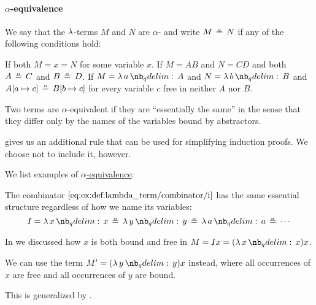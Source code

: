 \paragraph{\( \alpha \)-equivalence}

\begin{definition}\label{def:lambda_term_alpha_equivalence}\mimprovised
  We say that the \( \mathrm{\lambda} \)-terms \( M \) and \( N \) are \( \alpha \)- and write \( M \aequiv N \) if any of the following conditions hold:
  \begin{thmenum}
     If both \( M = x = N \) for some variable \( x \).
     If \( M = A B \) and \( N = C D \) and both \( A \aequiv C \) and \( B \aequiv D \).
     If \( M = \qabs a A \) and \( N = \qabs b B \) and \( A[a \mapsto c] \aequiv B[b \mapsto c] \) for every variable \( c \) free in neither \( A \) nor \( B \).
  \end{thmenum}
\end{definition}
\begin{comments}
  \item Two terms are \( \alpha \)-equivalent if they are \enquote{essentially the same} in the sense that they differ only by the names of the variables bound by abstractors.

  \item {} gives us an additional rule that can be used for simplifying induction proofs. We choose not to include it, however.
\end{comments}

\begin{example}\label{ex:def:lambda_term_alpha_equivalence}
  We list examples of \hyperref[def:lambda_term_alpha_equivalence]{\( \alpha \)-equivalence}:
  \begin{thmenum}
     The combinator \( \ref{eq:ex:def:lambda_term/combinator/i} \) has the same essential structure regardless of how we name its variables:
    \begin{equation*}
      I = \qabs x x \aequiv \qabs y y \aequiv \qabs a a \aequiv \cdots
    \end{equation*}

     In  we discussed how \( x \) is both bound and free in \( M = Ix = (\qabs x x) x \).

    We can use the term \( M' = (\qabs y y) x \) instead, where all occurrences of \( x \) are free and all occurrences of \( y \) are bound.

    This is generalized by .
  \end{thmenum}
\end{example}

